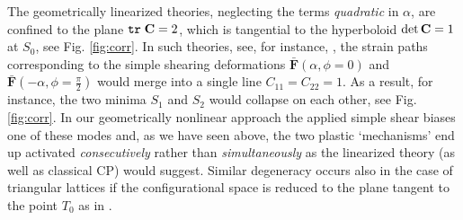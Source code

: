 \documentclass[CRPHYS,Unicode,manuscript]{cedram}
\def\tr{{\tt tr}\hspace{1mm}}
\begin{document}
The geometrically  linearized theories, neglecting the terms \emph{quadratic} in $\alpha$,   are   confined to the plane $\tr {\bf C} =2$,  which is tangential to the hyperboloid $\det{\bold C}=1$ at $S_0$, see Fig. \ref{fig:corr}. 
In such theories, see, for instance,   \cite{Onuki2003-ln,Carpio2005-fl,Minami2007-ew,Geslin2014-ad}, the strain paths corresponding to the simple shearing deformations $\mathbf{\bar{F}}(\alpha,\phi=0)$ and $\mathbf{\bar{F}}(-\alpha, \phi=\frac{\pi}{2})$ would merge into a single line $C_{11}=C_{22}=1$. As a result, for instance, the two minima $S_1$ and $S_{2}$ would collapse on each other, see Fig. \ref{fig:corr}.   In our  geometrically nonlinear approach the  applied simple shear  biases one of these modes  and, as we have seen above,  the two   plastic `mechanisms' end up  activated \emph{consecutively} rather than \emph{simultaneously} as the linearized theory (as well as classical CP) would suggest.  Similar degeneracy  occurs  also  in the case of triangular lattices if the  configurational space is reduced to the plane tangent to the point $T_0$ as in \cite{Onuki2005-xp}.


\end{document}

